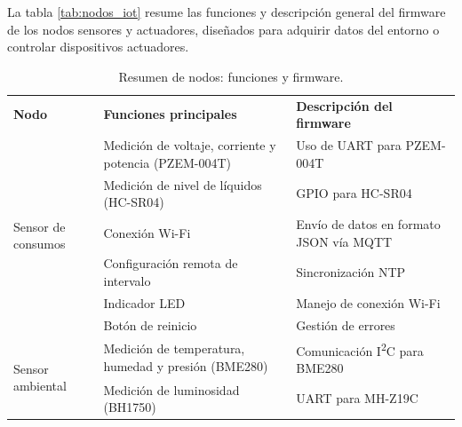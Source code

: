 La tabla \ref{tab:nodos_iot} resume las funciones y descripción general del
firmware de los nodos sensores y actuadores, diseñados para adquirir datos del
entorno o controlar dispositivos actuadores.

\begin{table}[H]
    \centering
    \caption[Resumen de nodos]{Resumen de nodos: funciones y firmware.}
    \begin{tabular}{p{1.5cm}p{5.4cm}p{5.5cm}}
        \hline
        \textbf{Nodo}                                     & \textbf{Funciones principales}                                                & \textbf{Descripción del firmware}              \\
        \multirow{6}{1.5cm}{Sensor de consumos}           & Medición de voltaje, corriente y potencia (PZEM-004T)                         & Uso de UART para PZEM-004T                     \\
                                                          & Medición de nivel de líquidos (HC-SR04)                                       & GPIO para HC-SR04                              \\
                                                          & Conexión Wi-Fi                                                                & Envío de datos en formato JSON vía MQTT        \\
                                                          & Configuración remota de intervalo                                             & Sincronización NTP                             \\
                                                          & Indicador LED                                                                 & Manejo de conexión Wi-Fi                       \\
                                                          & Botón de reinicio                                                             & Gestión de errores                             \\
        \hline
        \multirow{7}{1.5cm}{Sensor ambiental}             & Medición de temperatura, humedad y presión (BME280)                           & Comunicación I\textsuperscript{2}C para BME280 \\
                                                          & Medición de luminosidad (BH1750)                                              & UART para MH-Z19C                              \\

\end{tabular}
\end{table}

